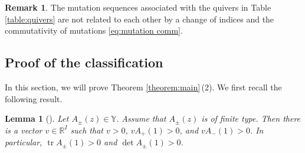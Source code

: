 \documentclass[10pt,a4paper]{amsart}
\numberwithin{equation}{section}
\newtheorem{Lemma}[Theorem]{Lemma}
\theoremstyle{definition}
\newtheorem{Remark}[Theorem]{Remark}
\DeclareMathOperator{\tr}{tr}
\begin{document}
\begin{Remark}\label{remark:quiver is different}
 The mutation sequences associated with the quivers in Table \ref{table:quivers}
 are not related to each other by
 a change of indices and the commutativity of mutations \eqref{eq:mutation comm}.
\end{Remark}

\subsection{Proof of the classification}
\label{section:proof of classification}
In this section, we will prove Theorem \ref{theorem:main}\,(2). We first recall the following result.
\begin{Lemma}[{\cite[Theorem 5.5]{mizuno2020difference}}]
 \label{lemma:simultaneous positive}
 Let $A_\pm(z) \in \mathbb{Y}$. Assume that $A_\pm(z)$ is of finite type.
 Then there is a vector $v \in \mathbb{R}^I$ such that $v > 0$,
 $v A_+(1) > 0$, and $v A_-(1) > 0$.
 In particular, $\tr A_\pm (1) >0$ and $\det A_\pm (1) > 0$.
\end{Lemma}
\end{document}
